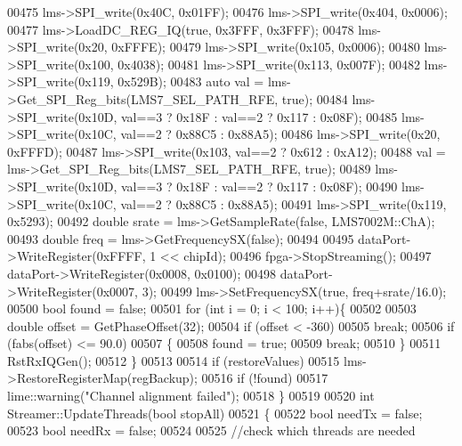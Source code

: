 \begin{DoxyCode}
00475     lms->SPI_write(0x40C, 0x01FF);
00476     lms->SPI_write(0x404, 0x0006);
00477     lms->LoadDC_REG_IQ(\textcolor{keyword}{true}, 0x3FFF, 0x3FFF);
00478     lms->SPI_write(0x20, 0xFFFE);
00479     lms->SPI_write(0x105, 0x0006);
00480     lms->SPI_write(0x100, 0x4038);
00481     lms->SPI_write(0x113, 0x007F);
00482     lms->SPI_write(0x119, 0x529B);
00483     \textcolor{keyword}{auto} val = lms->Get_SPI_Reg_bits(LMS7_SEL_PATH_RFE, \textcolor{keyword}{true});
00484     lms->SPI_write(0x10D, val==3 ? 0x18F : val==2 ? 0x117 : 0x08F);
00485     lms->SPI_write(0x10C, val==2 ? 0x88C5 : 0x88A5);
00486     lms->SPI_write(0x20, 0xFFFD);
00487     lms->SPI_write(0x103, val==2 ? 0x612 : 0xA12);
00488     val = lms->Get_SPI_Reg_bits(LMS7_SEL_PATH_RFE, \textcolor{keyword}{true});
00489     lms->SPI_write(0x10D, val==3 ? 0x18F : val==2 ? 0x117 : 0x08F);
00490     lms->SPI_write(0x10C, val==2 ? 0x88C5 : 0x88A5);
00491     lms->SPI_write(0x119, 0x5293);
00492     \textcolor{keywordtype}{double} srate = lms->GetSampleRate(\textcolor{keyword}{false}, LMS7002M::ChA);
00493     \textcolor{keywordtype}{double} freq = lms->GetFrequencySX(\textcolor{keyword}{false});
00494 
00495     dataPort->WriteRegister(0xFFFF, 1 << chipId);
00496     fpga->StopStreaming();
00497     dataPort->WriteRegister(0x0008, 0x0100);
00498     dataPort->WriteRegister(0x0007, 3);
00499     lms->SetFrequencySX(\textcolor{keyword}{true}, freq+srate/16.0);
00500     \textcolor{keywordtype}{bool} found = \textcolor{keyword}{false};
00501     \textcolor{keywordflow}{for} (\textcolor{keywordtype}{int} i = 0; i < 100; i++)\{
00502 
00503         \textcolor{keywordtype}{double} offset = GetPhaseOffset(32);
00504         \textcolor{keywordflow}{if} (offset < -360)
00505             \textcolor{keywordflow}{break};
00506         \textcolor{keywordflow}{if} (fabs(offset) <= 90.0)
00507         \{
00508             found = \textcolor{keyword}{true};
00509             \textcolor{keywordflow}{break};
00510         \}
00511         RstRxIQGen();
00512     \}
00513 
00514     \textcolor{keywordflow}{if} (restoreValues)
00515         lms->RestoreRegisterMap(regBackup);
00516     \textcolor{keywordflow}{if} (!found)
00517         lime::warning(\textcolor{stringliteral}{"Channel alignment failed"});
00518 \}
00519 
00520 \textcolor{keywordtype}{int} Streamer::UpdateThreads(\textcolor{keywordtype}{bool} stopAll)
00521 \{
00522     \textcolor{keywordtype}{bool} needTx = \textcolor{keyword}{false};
00523     \textcolor{keywordtype}{bool} needRx = \textcolor{keyword}{false};
00524 
00525     \textcolor{comment}{//check which threads are needed}

\end{DoxyCode}
